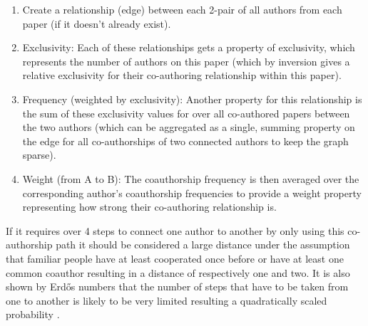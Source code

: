 \begin{enumerate}
  \item Create a relationship (edge) between each 2-pair of all authors from each paper (if it doesn't already exist).
  \item Exclusivity: Each of these relationships gets a property of exclusivity, which represents the number of authors on this paper (which by inversion gives a relative exclusivity for their co-authoring relationship within this paper).
  \item Frequency (weighted by exclusivity): Another property for this relationship is the sum of these exclusivity values for over all co-authored papers between the two authors (which can be aggregated as a single, summing property on the edge for all co-authorships of two connected authors to keep the graph sparse).
  \item Weight (from A to B): The coauthorship frequency is then averaged over the corresponding author's coauthorship frequencies to provide a weight property representing how strong their co-authoring relationship is. %
\end{enumerate}

If it requires over 4 steps to connect one author to another by only using this co-authorship path it should be considered a large distance under the assumption that familiar people have at least cooperated once before or have at least one common coauthor resulting in a distance of respectively one and two.
It is also shown by Erd\H{o}s numbers that the number of steps that have to be taken from one to another is likely to be very limited resulting a quadratically scaled probability \cite{balaban2002co}.
